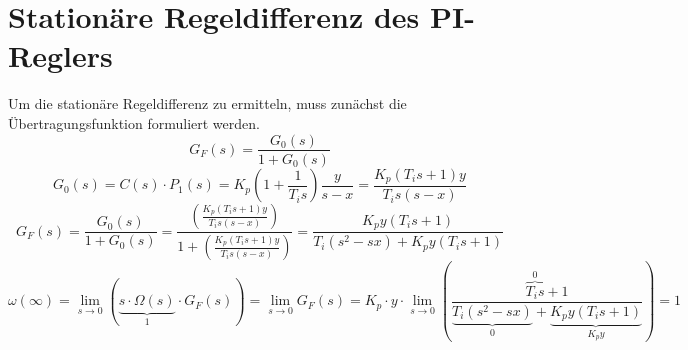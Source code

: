 \section{Stationäre Regeldifferenz des PI-Reglers}
Um die stationäre Regeldifferenz zu ermitteln, muss zunächst die
Übertragungsfunktion formuliert werden.
\[
	G_F(s) = \frac{G_0(s)}{1+G_0(s)}
\]
\[
	G_0(s)
	= C(s) \cdot P_1(s)
	= K_p \left( 1 + \frac{1}{T_i s} \right) \frac{y}{s-x}
	= \frac{K_p(T_i s + 1) y}{T_i s (s-x)}
\]
\[
	G_F(s)
	= \frac{G_0(s)}{1 + G_0(s)}
	= \frac{
		\left( \frac{K_p(T_i s + 1) y}{T_i s (s-x)} \right)
	}{
		1 + \left( \frac{K_p(T_i s + 1) y}{T_i s (s-x)} \right)
	}
	= \frac{
		K_p y (T_i s + 1)
	}{
		T_i(s^2 - sx) + K_p y (T_i s + 1)
	}
\]
\[
	\omega(\infty)
	= \lim_{s \rightarrow 0} \left(
		\underbrace{s \cdot \Omega(s)}_{1} \cdot G_F(s)
	\right)
	= \lim_{s \rightarrow 0} G_F(s)
	= K_p \cdot y \cdot \lim_{s \rightarrow 0} \left(
		\frac{
			\overbrace{T_i s}^{0} + 1
		}{
			\underbrace{T_i(s^2 - sx)}_{0} 
			+ \underbrace{K_p y (T_i s + 1)}_{K_p y}
		}
	\right)
	= 1
\]
